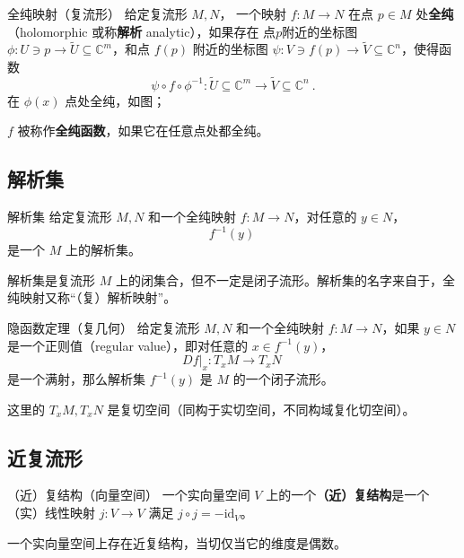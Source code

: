 
\begin{definition}{全纯映射（复流形）}
给定复流形 $M, N$， 一个映射 $f: M \to N$ 在点 $p \in M$ 处\textbf{全纯}（holomorphic 或称\textbf{解析} analytic），如果存在 点$p$附近的坐标图 $\phi: U \ni p \to \tilde{U} \subseteq \mathbb{C}^m$，和点 $f(p)$ 附近的坐标图 $\psi: V \ni f(p) \to \tilde{V} \subseteq \mathbb{C}^n$，使得函数
$$
\psi \circ f \circ \phi^{-1}: \tilde{U} \subseteq \mathbb{C}^m \to \tilde{V} \subseteq \mathbb{C}^n~.
$$
在 $\phi(x)$ 点处全纯，如图；

$f$ 被称作\textbf{全纯函数}，如果它在任意点处都全纯。
\end{definition}



\subsection{解析集}

\begin{definition}{解析集}
给定复流形 $M, N$ 和一个全纯映射 $f: M \to N$，对任意的 $y \in N$，
$$
f^{-1}(y)~
$$
是一个 $M$ 上的解析集。
\end{definition}

解析集是复流形 $M$ 上的闭集合，但不一定是闭子流形。解析集的名字来自于，全纯映射又称“（复）解析映射”。

\begin{theorem}{隐函数定理（复几何）}
给定复流形 $M, N$ 和一个全纯映射 $f: M \to N$，如果 $y \in N$ 是一个正则值（regular value），即对任意的 $x \in f^{-1}(y)$，
$$
D f|_x: T_x M \to T_x N~
$$
是一个满射，那么解析集 $f^{-1}(y)$ 是 $M$ 的一个闭子流形。
\end{theorem}
这里的 $T_x M, T_x N$ 是复切空间（同构于实切空间，不同构域复化切空间）。


\subsection{近复流形}

\begin{definition}{（近）复结构（向量空间）}
一个实向量空间 $V$ 上的一个\textbf{（近）复结构}是一个（实）线性映射 $j: V \to V$ 满足 $j \circ j = - \text{id}_V$。
\end{definition}

\begin{theorem}{}
一个实向量空间上存在近复结构，当切仅当它的维度是偶数。
\end{theorem}

